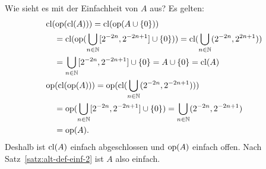 %
    Wie
    sieht es mit der Einfachheit von $A$ aus?
    Es gelten:
    \begin{align*}
        &\text{cl}(\text{op}(\text{cl}(A))) 
        = \text{cl}(\text{op}(A \cup \{0\})) 
        \\
        &\quad = \text{cl}(\text{op}(\bigcup_{n \in \mathbb{N}} [2^{-2n}, 2^{-2n+1}] \cup \{0\})) 
        = \text{cl}(\bigcup_{n \in \mathbb{N}} (2^{-2n}, 2^{2n+1})) 
        \\
        &\quad = \bigcup_{n \in \mathbb{N}} [2^{-2n}, 2^{-2n+1}] \cup \{0\} 
        = A \cup \{0\} 
        = \text{cl}(A)
        \\
        &\text{op}(\text{cl}(\text{op}(A))) 
        = \text{op}(\text{cl}(\bigcup_{n \in \mathbb{N}} (2^{-2n}, 2^{-2n+1})))
        \\
        &\quad = \text{op}(\bigcup_{n \in \mathbb{N}} [2^{-2n}, 2^{-2n+1}] \cup \{0\})
        = \bigcup_{n \in \mathbb{N}} (2^{-2n}, 2^{-2n+1})
        \\
        &\quad = \text{op}(A).
    \end{align*}
%
    Deshalb ist $\text{cl}(A)$ einfach abgeschlossen und $\text{op}(A)$ einfach offen. 
    Nach Satz~\ref{satz:alt-def-einf-2} ist $A$ also einfach.

